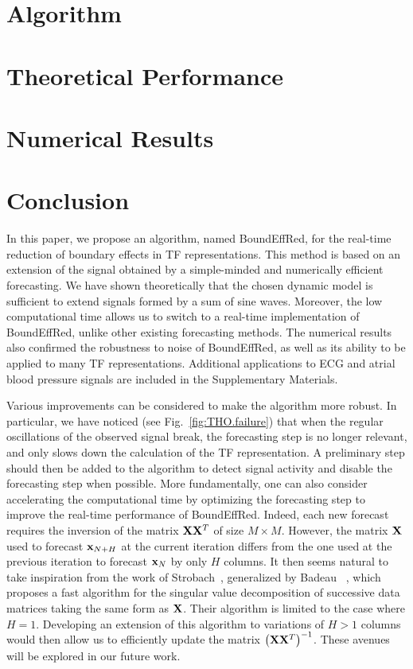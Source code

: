 \documentclass[journal]{IEEEtran}
\begin{document}
\section{Algorithm}
\label{se:algo}



\section{Theoretical Performance}
\label{se:theoretical}


\section{Numerical Results}
\label{se:results}


\section{Conclusion}
\label{se:conclusion}
In this paper, we propose an algorithm, named {\sf BoundEffRed}, for the real-time reduction of boundary effects in TF representations. This method is based on an extension of the signal obtained by a simple-minded and numerically efficient forecasting. We have shown theoretically that the chosen dynamic model is sufficient to extend signals formed by a sum of sine waves. Moreover, the low computational time allows us to switch to a real-time implementation of {\sf BoundEffRed}, unlike other existing forecasting methods. The numerical results also confirmed the robustness to noise of {\sf BoundEffRed}, as well as its ability to be applied to many TF representations. Additional applications to ECG and atrial blood pressure signals are included in the Supplementary Materials.

Various improvements can be considered to make the algorithm more robust. In particular, we have noticed (see Fig.~\ref{fig:THO.failure}) that when the regular oscillations of the observed signal break, the forecasting step is no longer relevant, and only slows down the calculation of the TF representation. A preliminary step should then be added to the algorithm to detect signal activity and disable the forecasting step when possible. More fundamentally, one can also consider accelerating the computational time by optimizing the forecasting step to improve the real-time performance of {\sf BoundEffRed}. Indeed, each new forecast requires the inversion of the matrix ${\mathbf X}{\mathbf X}^T$ of size $M\times M$. However, the matrix ${\mathbf X}$ used to forecast ${\mathbf x}_{N+H}$ at the current iteration differs from the one used at the previous iteration to forecast ${\mathbf x}_{N}$ by only $H$ columns. It then seems natural to take inspiration from the work of Strobach~\cite{Strobach97square}, generalized by Badeau \etal~\cite{Badeau04sliding}, which proposes a fast algorithm for the singular value decomposition of successive data matrices taking the same form as ${\mathbf X}$. Their algorithm is limited to the case where $H=1$. Developing an extension of this algorithm to variations of $H>1$ columns would then allow us to efficiently update the matrix $\left({\mathbf X}{\mathbf X}^T\right)^{-1}$. These avenues will be explored in our future work.
\end{document}
